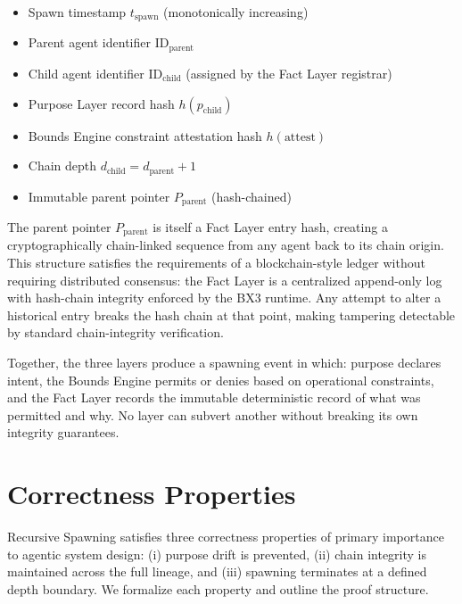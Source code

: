 \begin{itemize}
  \itemsep0em
  \itemsep0em
  \itemsep0em
  \item Spawn timestamp $t_\text{spawn}$ (monotonically increasing)
  \item Parent agent identifier $\text{ID}_\text{parent}$
  \item Child agent identifier $\text{ID}_\text{child}$ (assigned by the
    Fact Layer registrar)
  \item Purpose Layer record hash $h(p_\text{child})$
  \item Bounds Engine constraint attestation hash $h(\text{attest})$
  \item Chain depth $d_\text{child} = d_\text{parent} + 1$
  \item Immutable parent pointer $P_\text{parent}$ (hash-chained)
\end{itemize}

The parent pointer $P_\text{parent}$ is itself a Fact Layer entry hash,
creating a cryptographically chain-linked sequence from any agent back
to its chain origin. This structure satisfies the requirements of a
blockchain-style ledger without requiring distributed consensus: the
Fact Layer is a centralized append-only log with hash-chain integrity
enforced by the BX3 runtime. Any attempt to alter a historical entry
breaks the hash chain at that point, making tampering detectable by
standard chain-integrity verification.

Together, the three layers produce a spawning event in which:
purpose declares intent, the Bounds Engine permits or denies based on
operational constraints, and the Fact Layer records the immutable
deterministic record of what was permitted and why. No layer can
subvert another without breaking its own integrity guarantees.


\section{Correctness Properties}
\label{sec:correctness}

Recursive Spawning satisfies three correctness properties of primary
importance to agentic system design: (i) purpose drift is prevented,
(ii) chain integrity is maintained across the full lineage, and
(iii) spawning terminates at a defined depth boundary. We formalize
each property and outline the proof structure.

